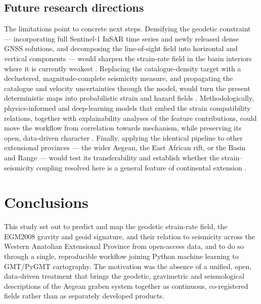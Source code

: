 \documentclass[pdflatex,sn-mathphys-num]{sn-jnl}%
\theoremstyle{thmstyleone}%
\theoremstyle{thmstyletwo}%
\theoremstyle{thmstylethree}%
\begin{document}
\subsection{Future research directions}\label{sec:future}
The limitations point to concrete next steps. Densifying the geodetic constraint ---
incorporating full Sentinel-1 InSAR time series and newly released dense GNSS solutions,
and decomposing the line-of-sight field into horizontal and vertical components --- would
sharpen the strain-rate field in the basin interiors where it is currently weakest
\cite{Morishita2020,Kurt2023,Weiss2020}. Replacing the catalogue-density target with a
declustered, magnitude-complete seismicity measure, and propagating the catalogue and
velocity uncertainties through the model, would turn the present deterministic maps into
probabilistic strain and hazard fields \cite{Storchak2013,Kreemer2014,Lemenkova202606,ManaughKreemer2018,Bahrami2021}.
Methodologically, physics-informed and deep-learning models that embed the strain
compatibility relations, together with explainability analyses of the feature
contributions, could move the workflow from correlation towards mechanism, while
preserving its open, data-driven character \cite{Reichstein2019,Rouet2021,Lemenkova202403,Kong2019,Bergen2019}.
Finally, applying the identical pipeline to other extensional provinces --- the wider
Aegean, the East African rift, or the Basin and Range --- would test its transferability
and establish whether the strain--seismicity coupling resolved here is a general feature
of continental extension \cite{Bird2003,Stadler2010,Kreemer2014,Lemenkova202205,Floyd2010,PerouseVernant2012}.

\section{Conclusions}\label{sec:conclusions}
This study set out to predict and map the geodetic strain-rate field, the EGM2008
gravity and geoid signature, and their relation to seismicity across the Western
Anatolian Extensional Province from open-access data, and to do so through a single,
reproducible workflow joining Python machine learning to GMT/PyGMT cartography. The
motivation was the absence of a unified, open, data-driven treatment that brings the
geodetic, gravimetric and seismological descriptions of the Aegean graben system
together as continuous, co-registered fields rather than as separately developed
products.
\end{document}
